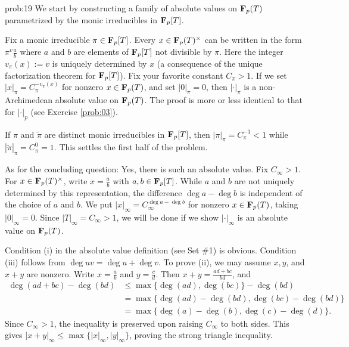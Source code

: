 \begin{sol}{prob:19} We start by constructing a family of absolute values on $\mathbf{F}_p(T)$ parametrized by the monic irreducibles in $\mathbf{F}_p[T]$. 

Fix a monic irreducible $\pi \in \mathbf{F}_p[T]$. Every $x \in \mathbf{F}_p(T)^{\times}$ can be written in the form $\pi^{v} \frac{a}{b}$ where $a$ and $b$ are elements of $\mathbf{F}_p[T]$ not divisible by $\pi$. Here the integer $v_\pi(x):=v$ is uniquely determined by $x$ (a consequence of the unique factorization theorem for $\mathbf{F}_p[T]$). Fix your favorite constant $C_{\pi} > 1$. If we set $|x|_{\pi} = C_\pi^{-v_\pi(x)}$ for nonzero $x \in \mathbf{F}_p(T)$, and set $|0|_{\pi}=0$, then $|\cdot|_{\pi}$ is a non-Archimedean absolute value on $\mathbf{F}_p(T)$. The proof is more or less identical to that for $|\cdot|_p$ (see Exercise \ref{prob:03}). 

If $\pi$ and $\tilde{\pi}$ are distinct monic irreducibles in $\mathbf{F}_p[T]$, then $|\pi|_{\pi} = C_{\pi}^{-1} < 1$ while $|\tilde{\pi}|_{\pi} = C_{\pi}^{0} = 1$. This settles the first half of the problem.

As for the concluding question: Yes, there is such an absolute value. Fix $C_{\infty} > 1$. For $x \in \mathbf{F}_p(T)^{\times}$, write $x = \frac{a}{b}$ with $a, b \in \mathbf{F}_p[T]$. While $a$ and $b$ are not uniquely determined by this representation, the difference $\deg{a} - \deg{b}$ is independent of the choice of $a$ and $b$. We put $|x|_{\infty} = C_{\infty}^{\deg{a}-\deg{b}}$ for nonzero $x \in \mathbf{F}_p(T)$, taking $|0|_{\infty} = 0$. Since $|T|_{\infty} = C_{\infty} > 1$, we will be done if we show $|\cdot|_{\infty}$ is an absolute value on $\mathbf{F}_p(T)$.

Condition (i) in the absolute value definition (see Set \#1) is obvious. Condition (iii) follows from $\deg{uv} = \deg{u} + \deg{v}$. To prove (ii), we may assume $x,y$, and $x+y$ are nonzero. Write $x = \frac{a}{b}$ and $y= \frac{c}{d}$. Then $x+y = \frac{ad+bc}{bd}$, and
\begin{align*} \deg(ad+bc) - \deg(bd) &\le \max\{\deg(ad),\deg(bc)\} - \deg(bd) \\
&= \max\{\deg(ad) - \deg(bd),\deg(bc) -\deg(bd)\}\\
&= \max\{\deg(a)-\deg(b),\deg(c)-\deg(d)\}.
\end{align*}
Since $C_{\infty} > 1$, the inequality is preserved upon raising $C_{\infty}$ to both sides. This gives $|x+y|_{\infty} \le \max\{|x|_{\infty},|y|_{\infty}\}$, proving the strong triangle inequality.
\end{sol}

